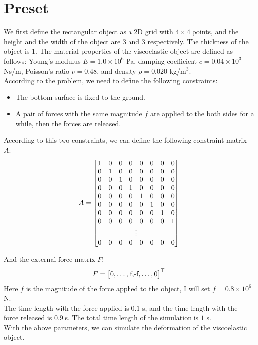 \documentclass{article}
\begin{document}
\section*{Preset}
We first define the rectangular object as a 2D grid with $4 \times 4$ points, and the height and the width of the object are $3$ and $3$ respectively.
The thickness of the object is $1$. The material properties of the viscoelastic object are defined as follows: Young's modulus $E = 1.0 \times 10^6$ Pa, damping coefficient $c = 0.04 \times 10^3$ Ns/m, Poisson's ratio $\nu = 0.48$, and density $\rho = 0.020$ kg/m$^3$.\\
According to the problem, we need to define the following constraints:
\begin{itemize}
    \item The bottom surface is fixed to the ground.
    \item A pair of forces with the same magnitude $f$ are applied to the both sides for a while, then the forces are released.
\end{itemize}

According to this two constraints, we can define the following constraint matrix $A$:
\[
A = 
  \begin{bmatrix}
  1 & 0 & 0 & 0 & 0 & 0 & 0 & 0 \\
  0 & 1 & 0 & 0 & 0 & 0 & 0 & 0 \\
  0 & 0 & 1 & 0 & 0 & 0 & 0 & 0 \\
  0 & 0 & 0 & 1 & 0 & 0 & 0 & 0 \\
  0 & 0 & 0 & 0 & 1 & 0 & 0 & 0 \\
  0 & 0 & 0 & 0 & 0 & 1 & 0 & 0 \\
  0 & 0 & 0 & 0 & 0 & 0 & 1 & 0 \\
   0 & 0 & 0 & 0 & 0 & 0 & 0 & 1 \\
   \multicolumn{8}{c}{\vdots} \\
   0 & 0 & 0 & 0 & 0 & 0 & 0 & 0 \\
  \end{bmatrix}
\]

And the external force matrix $F$:
\[
F = 
  \begin{bmatrix}
  0, 
  \dots, 
  $ f$,  
  $-f$,
  \dots,
  0 
  \end{bmatrix}^\top
\]
Here $f$ is the magnitude of the force applied to the object, I will set $f = 0.8 \times 10^6$ N.\\
The time length with the force applied is $0.1$ s, and the time length with the force released is $0.9$ s. The total time length of the simulation is $1$ s.\\
With the above parameters, we can simulate the deformation of the viscoelastic object.\\
\newpage
\end{document}
